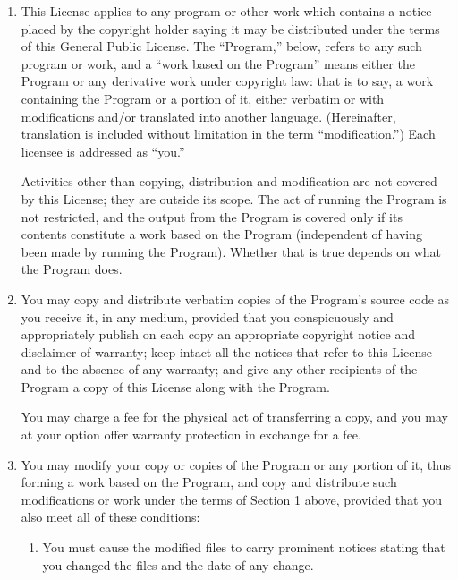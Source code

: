 \documentclass[11pt, letterpaper]{book}
\begin{document}
\begin{enumerate}

\addtocounter{enumi}{-1}
\item

This License applies to any program or other work which contains a notice
placed by the copyright holder saying it may be distributed under the
terms of this General Public License. The ``Program,'' below, refers to
any such program or work, and a ``work based on the Program'' means either
the Program or any derivative work under copyright law: that is to say, a
work containing the Program or a portion of it, either verbatim or with
modifications and/or translated into another language. (Hereinafter,
translation is included without limitation in the term ``modification.'')
Each licensee is addressed as ``you.''

Activities other than copying, distribution and modification are not
covered by this License; they are outside its scope. The act of
running the Program is not restricted, and the output from the Program
is covered only if its contents constitute a work based on the
Program (independent of having been made by running the Program).
Whether that is true depends on what the Program does.

\item You may copy and distribute verbatim copies of the Program's source
  code as you receive it, in any medium, provided that you conspicuously
  and appropriately publish on each copy an appropriate copyright notice
  and disclaimer of warranty; keep intact all the notices that refer to
  this License and to the absence of any warranty; and give any other
  recipients of the Program a copy of this License along with the Program.

You may charge a fee for the physical act of transferring a copy, and you
may at your option offer warranty protection in exchange for a fee.

\item

You may modify your copy or copies of the Program or any portion
of it, thus forming a work based on the Program, and copy and
distribute such modifications or work under the terms of Section 1
above, provided that you also meet all of these conditions:

\begin{enumerate}

\item

You must cause the modified files to carry prominent notices stating that
you changed the files and the date of any change.


\end{enumerate}
\end{enumerate}
\end{document}
